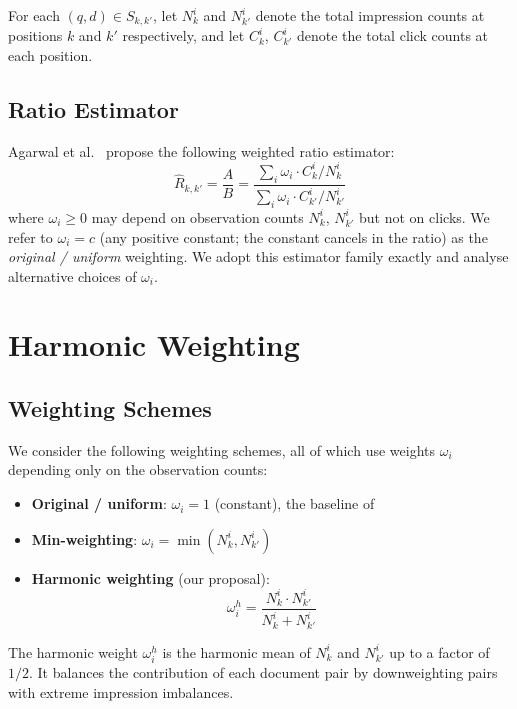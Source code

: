 \documentclass[sigconf]{acmart}
\begin{document}
For each $(q,d) \in S_{k,k'}$, let $N_k^i$ and $N_{k'}^i$ denote the total impression counts at positions $k$ and $k'$ respectively, and let $C_k^i$, $C_{k'}^i$ denote the total click counts at each position.

\subsection{Ratio Estimator}
\label{sec:ratio-estimator}

Agarwal et al.~\cite{agarwal2019estimating} propose the following weighted ratio estimator:
\begin{equation}
\hat{R}_{k,k'} = \frac{A}{B} = \frac{\sum_i \omega_i \cdot C_k^i / N_k^i}{\sum_i \omega_i \cdot C_{k'}^i / N_{k'}^i}
\end{equation}
where $\omega_i \geq 0$ may depend on observation counts $N_k^i$, $N_{k'}^i$ but not on clicks.
We refer to $\omega_i = c$ (any positive constant; the constant cancels in the ratio) as the
\emph{original / uniform} weighting. We adopt this estimator family exactly and analyse alternative
choices of $\omega_i$.

\section{Harmonic Weighting}
\label{sec:harmonic_weight}

\subsection{Weighting Schemes}

We consider the following weighting schemes, all of which use weights $\omega_i$ depending only on the observation counts:

\begin{itemize}
\item \textbf{Original / uniform}: $\omega_i = 1$ (constant), the baseline of \cite{agarwal2019estimating}
\item \textbf{Min-weighting}: $\omega_i = \min(N_k^i, N_{k'}^i)$
\item \textbf{Harmonic weighting} (our proposal):
\begin{equation}
\omega_i^h = \frac{N_k^i \cdot N_{k'}^i}{N_k^i + N_{k'}^i}
\end{equation}
\end{itemize}

The harmonic weight $\omega_i^h$ is the harmonic mean of $N_k^i$ and $N_{k'}^i$ up to a factor of $1/2$. It balances the contribution of each document pair by downweighting pairs with extreme impression imbalances.
\end{document}
